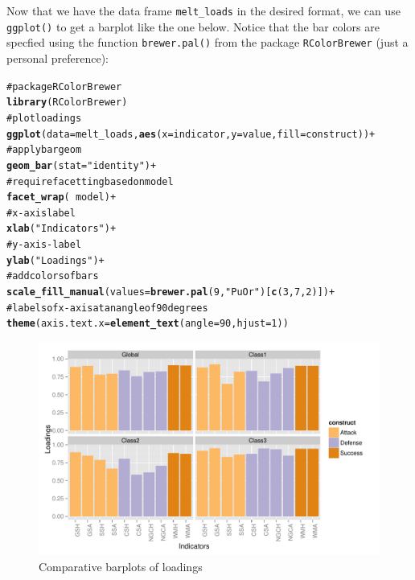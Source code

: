 \documentclass[12pt]{book}\usepackage{graphicx, color}
\makeatletter
\newcommand{\hlfunctioncall}[1]{\textcolor[rgb]{0.501960784313725,0,0.329411764705882}{\textbf{#1}}}%
\newcommand{\hlstring}[1]{\textcolor[rgb]{0.6,0.6,1}{#1}}%
\newcommand{\hlcomment}[1]{\textcolor[rgb]{0.180392156862745,0.6,0.341176470588235}{#1}}%
\newenvironment{kframe}{%
 \def\at@end@of@kframe{}%
 \ifinner\ifhmode%
  \def\at@end@of@kframe{\end{minipage}}%
  \begin{minipage}{\columnwidth}%
 \fi\fi%
 \def\FrameCommand##1{\hskip\@totalleftmargin \hskip-\fboxsep
 \colorbox{shadecolor}{##1}\hskip-\fboxsep
     \hskip-\linewidth \hskip-\@totalleftmargin \hskip\columnwidth}%
 \MakeFramed {\advance\hsize-\width
   \@totalleftmargin\z@ \linewidth\hsize
   \@setminipage}}%
 {\par\unskip\endMakeFramed%
 \at@end@of@kframe}
\newenvironment{knitrout}{}{} %
\newcommand{\code}[1]{\texttt{#1}}
\makeatother
\begin{document}
Now that we have the data frame \code{melt\_loads} in the desired format, we can use \code{ggplot()} to get a barplot like the one below. Notice that the bar colors are specfied using the function \code{brewer.pal()} from the package \code{RColorBrewer} (just a personal preference):

\begin{knitrout}
\color{fgcolor}\begin{kframe}
\begin{alltt}
\hlcomment{# package RColorBrewer}
\hlfunctioncall{library}(RColorBrewer)
\hlcomment{# plot loadings}
\hlfunctioncall{ggplot}(data=melt_loads, \hlfunctioncall{aes}(x=indicator, y=value, fill=construct)) +
\hlcomment{  # apply bar geom}
  \hlfunctioncall{geom_bar}(stat = \hlstring{"identity"}) +
\hlcomment{  # require facetting based on model}
  \hlfunctioncall{facet_wrap}(~ model) + 
\hlcomment{  # x-axis label}
  \hlfunctioncall{xlab}(\hlstring{"Indicators"}) +
\hlcomment{  # y-axis-label}
  \hlfunctioncall{ylab}(\hlstring{"Loadings"}) +
\hlcomment{  # add colors of bars}
  \hlfunctioncall{scale_fill_manual}(values = \hlfunctioncall{brewer.pal}(9, \hlstring{"PuOr"})[\hlfunctioncall{c}(3,7,2)]) +
\hlcomment{  # labels of x-axis at an angle of 90 degrees}
  \hlfunctioncall{theme}(axis.text.x = \hlfunctioncall{element_text}(angle = 90, hjust = 1))
\end{alltt}
\end{kframe}
\end{knitrout}


\begin{knitrout}
\color{fgcolor}\begin{figure}[h]


{\centering \includegraphics[width=0.95\linewidth,height=.65\linewidth]{figure/melt_loads_ggplot} 

}

\caption[Comparative barplots of loadings]{Comparative barplots of loadings\label{fig:melt_loads_ggplot}}
\end{figure}


\end{knitrout}
\end{document}
